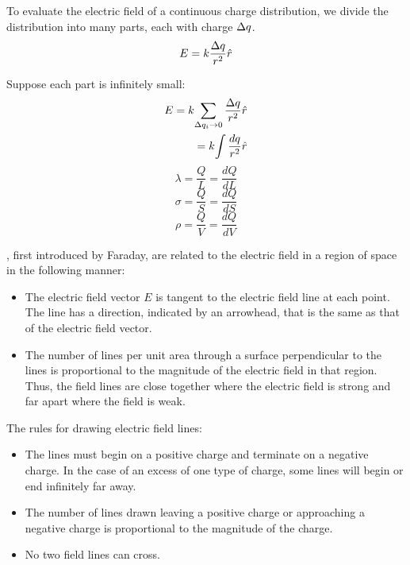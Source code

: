         \par To evaluate the electric field of a continuous charge distribution, we divide the
        distribution into many parts, each with charge $\Delta q$.
        \begin{align*}
            E = k \frac{\Delta q}{r^{2}} \hat{r}
        \end{align*}
        \par Suppose each part is infinitely small:
        \begin{align*}
            E = k {\sum\limits _{\Delta q_{i} \to 0} \frac{\Delta q}{r^{2}} \hat{r}} \\
            = k {\int\limits \frac{dq}{r^{2}} \hat{r}}
        \end{align*}
            \begin{equation}
                \lambda = \frac{Q}{L} = \frac{dQ}{dL}
            \end{equation}
            \begin{equation}
                \sigma = \frac{Q}{S} = \frac{dQ}{dS}
            \end{equation}
            \begin{equation}
                \rho = \frac{Q}{V} = \frac{dQ}{dV}
            \end{equation}
    \hiiEND

    \par {}, first introduced by Faraday, are related to the electric
    field in a region of space in the following manner:
    \begin{itemize}
        \item The electric field vector $E$ is tangent to the electric field line at each point.
            The line has a direction, indicated by an arrowhead, that is the same as that of the
            electric field vector.
        \item The number of lines per unit area through a surface perpendicular to the lines is
            proportional to the magnitude of the electric field in that region. Thus, the field
            lines are close together where the electric field is strong and far apart where the
            field is weak.
    \end{itemize}
    \par The rules for drawing electric field lines:
    \begin{itemize}
        \item The lines must begin on a positive charge and terminate on a negative charge.
            In the case of an excess of one type of charge, some lines will begin or end infinitely
            far away.
        \item The number of lines drawn leaving a positive charge or approaching a negative charge
            is proportional to the magnitude of the charge.
        \item No two field lines can cross.
    \end{itemize}

